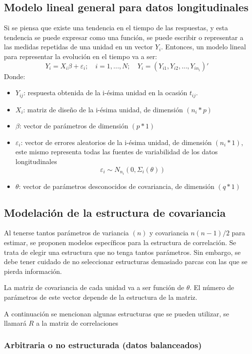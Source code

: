 \documentclass[12pt]{article}
\begin{document}
\subsection{Modelo lineal general para datos longitudinales}

Si se piensa que existe una tendencia en el tiempo de las respuestas, y esta tendencia se puede expresar como una función,
se puede escribir o representar a las medidas repetidas de una unidad en un vector $Y_i$. Entonces, un modelo lineal para
representar la evolución en el tiempo va a ser:
\[ Y_i = X_i\beta + \varepsilon_i; \quad i = 1, ..., N; \quad Y_i = (Y_{i1}, Y_{i2}, ..., Y_{in_{i}})' \]
Donde:

\begin{itemize}
	\item $Y_{ij}$: respuesta obtenida de la i-ésima unidad en la ocasión $t_{ij}$.
	\item $X_i$: matriz de diseño de la i-ésima unidad, de dimensión $(n_i*p)$
	\item $\beta $: vector de parámetros de dimensión $(p*1)$
	\item $\varepsilon_i$: vector de errores aleatorios de la i-ésima unidad, de dimensión $(n_i*1)$, este mismo representa todas
	las fuentes de variabilidad de los datos longitudinales
	\[ \varepsilon_i \sim N_{n_i}(0, \varSigma_i(\theta )) \]
	\item $\theta$: vector de parámetros desconocidos de covariancia, de dimensión $(q*1)$
\end{itemize}

\subsection{Modelación de la estructura de covariancia}

Al tenerse tantos parámetros de variancia $(n)$ y covariancia $n(n-1)/2$ para estimar, se proponen modelos específicos
para la estructura de correlación. Se trata de elegir una estructura que no tenga tantos parámetros. Sin embargo, se debe
tener cuidado de no seleccionar estructuras demasiado parcas con las que se pierda información.

La matriz de covariancia de cada unidad va a ser función de $\theta$. El número de parámetros de este vector depende de la
estructura de la matriz.

A continuación se mencionan algunas estructuras que se pueden utilizar, se llamará $R$ a la matriz de correlaciones

\subsubsection{Arbitraria o no estructurada (datos balanceados)}
\end{document}
